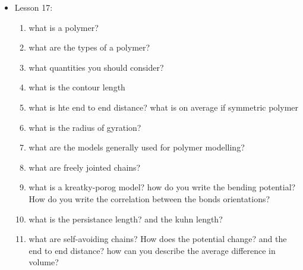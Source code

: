 {\begin{itemize}
\begin{enumerate}
        \item what does the Anfisen experiment tell us?
        \item what is the protein folding funnell?
        \item why to use CG?
        \item what type of approaches are available?
        \item what models are available?
        \item what is a lattice model?
        \item which types protein models exist?
        \item what is a martini model?
        \item what is a go model?
        \item what is inferred by saying that proteins are conformationally selected by ligands?
        \item How is the vibrational nature of proteins involved?
        \item what is a elastic network model?
        \item What are modes?
        \item how can you evaluate slow modes in ENMs?
        \item what are quasi-rigid domain description models?
    \end{enumerate}
    \item Lesson 17:
    \begin{enumerate}
        \item what is a polymer?
        \item what are the types of a polymer?
        \item what quantities you should consider?
        \item what is the contour length
        \item what is hte end to end distance? what is on average if symmetric polymer
        \item what is the radius of gyration?
        \item what are the models generally used for polymer modelling?
        \item what are freely jointed chains?
        \item what is a kreatky-porog model? how do you write the bending potential? How do you write the correlation between the bonds orientations?
        \item what is the persistance length? and the kuhn length?
        \item what are self-avoiding chains? How does the potential change? and the end to end distance? how can you describe the average difference in volume?

\end{enumerate}
\end{itemize}}

